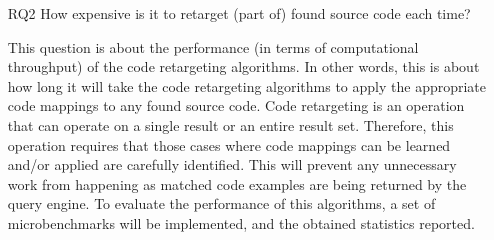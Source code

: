 \begin{itemize}
	\item[RQ2] How expensive is it to retarget (part of) found source code each time?
	
	This question is about the performance (in terms of computational throughput) of the code 
	retargeting algorithms. In other words, this is about how long it will take the code retargeting 
	algorithms to apply the appropriate code mappings to any found source code. Code retargeting is 
	an operation that can operate on a single result or an entire result set. Therefore, this 
	operation requires that those cases where code mappings can be learned and/or applied are 
	carefully identified. This will prevent any unnecessary work from happening as matched code 
	examples are being returned by the query engine. To evaluate the performance of this algorithms, 
	a set of microbenchmarks will be implemented, and the obtained statistics reported.
	
	

\end{itemize}
